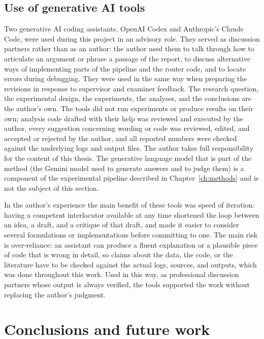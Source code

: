 \documentclass[english, bibtex]{kththesis}               %
\numberwithin{listing}{chapter}
\begin{document}
\section{Use of generative AI tools}
\label{sec:discGenAI}

Two generative AI coding assistants, OpenAI Codex and Anthropic's Claude Code, were used during this project in an advisory role. They served as discussion partners rather than as an author: the author used them to talk through how to articulate an argument or phrase a passage of the report, to discuss alternative ways of implementing parts of the pipeline and the router code, and to locate errors during debugging. They were used in the same way when preparing the revisions in response to supervisor and examiner feedback. The research question, the experimental design, the experiments, the analyses, and the conclusions are the author's own. The tools did not run experiments or produce results on their own; analysis code drafted with their help was reviewed and executed by the author, every suggestion concerning wording or code was reviewed, edited, and accepted or rejected by the author, and all reported numbers were checked against the underlying logs and output files. The author takes full responsibility for the content of this thesis. The generative language model that is part of the method (the Gemini model used to generate answers and to judge them) is a component of the experimental pipeline described in Chapter~\ref{ch:methods} and is not the subject of this section.

In the author's experience the main benefit of these tools was speed of iteration: having a competent interlocutor available at any time shortened the loop between an idea, a draft, and a critique of that draft, and made it easier to consider several formulations or implementations before committing to one. The main risk is over-reliance: an assistant can produce a fluent explanation or a plausible piece of code that is wrong in detail, so claims about the data, the code, or the literature have to be checked against the actual logs, sources, and outputs, which was done throughout this work. Used in this way, as professional discussion partners whose output is always verified, the tools supported the work without replacing the author's judgment.

\cleardoublepage
\chapter{Conclusions and future work}
\label{ch:conclusionsAndFutureWork}
\end{document}
